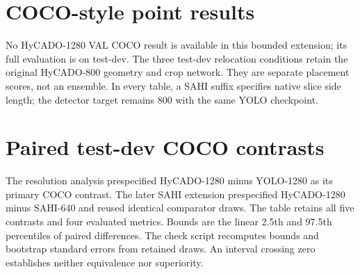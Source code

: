 \documentclass[10pt,letterpaper]{article}
\begin{document}
\section{COCO-style point results}
No HyCADO-1280 VAL COCO result is available in this bounded extension; its full evaluation is on test-dev. The three test-dev relocation conditions retain the original HyCADO-800 geometry and crop network. They are separate placement scores, not an ensemble. In every table, a SAHI suffix specifies native slice side length; the detector target remains 800 with the same YOLO checkpoint.
\begin{table}[h!]
\centering\footnotesize\setlength{\tabcolsep}{4pt}
\caption{VAL COCO-style point metrics, maxDets100.}

\end{table}
\clearpage
\begin{table}[t]
\centering\footnotesize\setlength{\tabcolsep}{3.6pt}
\caption{Test-dev COCO-style point metrics, maxDets100. Regions 800 / global 1280 is the mixed-resolution refinement variant.}

\end{table}
\begin{table}[h!]
\centering\footnotesize\setlength{\tabcolsep}{4pt}
\caption{VAL COCO-style sensitivity, maxDets500.}

\end{table}
\begin{table}[h!]
\centering\footnotesize\setlength{\tabcolsep}{3.6pt}
\caption{Test-dev COCO-style sensitivity, maxDets500.}

\end{table}
\clearpage
\section{Paired test-dev COCO contrasts}
The resolution analysis prespecified HyCADO-1280 minus YOLO-1280 as its primary COCO contrast. The later SAHI extension prespecified HyCADO-1280 minus SAHI-640 and reused identical comparator draws. The table retains all five contrasts and four evaluated metrics. Bounds are the linear 2.5th and 97.5th percentiles of paired differences. The check script recomputes bounds and bootstrap standard errors from retained draws. An interval crossing zero establishes neither equivalence nor superiority.
\begin{table}[h!]
\centering\footnotesize\setlength{\tabcolsep}{3.5pt}
\caption{Paired test-dev COCO differences at maxDets100. The two primary roles refer to the separately recorded resolution and SAHI protocols. All intervals are marginal 95\% intervals.}

\end{table}
\clearpage
\end{document}

